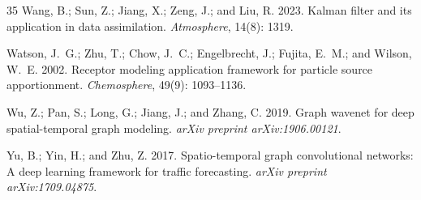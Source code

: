 \documentclass[letterpaper]{article} %
\theoremstyle{plain}
\theoremstyle{definition}
\theoremstyle{remark}
\begin{document}
\begin{thebibliography}{35}
Wang, B.; Sun, Z.; Jiang, X.; Zeng, J.; and Liu, R. 2023.
\newblock Kalman filter and its application in data assimilation.
\newblock \emph{Atmosphere}, 14(8): 1319.

Watson, J.~G.; Zhu, T.; Chow, J.~C.; Engelbrecht, J.; Fujita, E.~M.; and
  Wilson, W.~E. 2002.
\newblock Receptor modeling application framework for particle source
  apportionment.
\newblock \emph{Chemosphere}, 49(9): 1093--1136.

Wu, Z.; Pan, S.; Long, G.; Jiang, J.; and Zhang, C. 2019.
\newblock Graph wavenet for deep spatial-temporal graph modeling.
\newblock \emph{arXiv preprint arXiv:1906.00121}.

Yu, B.; Yin, H.; and Zhu, Z. 2017.
\newblock Spatio-temporal graph convolutional networks: A deep learning
  framework for traffic forecasting.
\newblock \emph{arXiv preprint arXiv:1709.04875}.

\end{thebibliography}

\appendix

\end{document}
